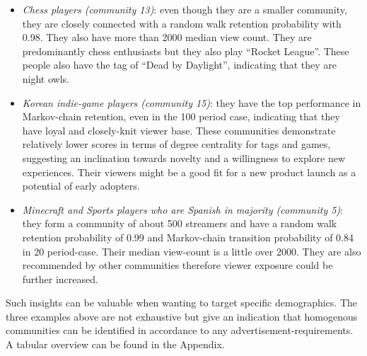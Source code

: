 \documentclass[11pt, oneside]{article}   	%
\begin{document}
\begin{itemize}
\item \textit{Chess players (community 13)}: even though they are a smaller community, they are closely connected with a random walk retention probability with 0.98. They also have more than 2000 median view count. They are predominantly chess enthusiasts but they also play “Rocket League”. These people also have the tag of “Dead by Daylight”, indicating that they are night owls.
\item \textit{Korean indie-game players (community 15)}: they have the top performance in Markov-chain retention, even in the 100 period case, indicating that they have loyal and closely-knit viewer base. These communities demonstrate relatively lower scores in terms of degree centrality for tags and games, suggesting an inclination towards novelty and a willingness to explore new experiences. Their viewers might be a good fit for a new product launch as a potential of early adopters.
\item \textit{Minecraft and Sports players who are Spanish in majority (community 5)}: they form a community of about 500 streamers and have a random walk retention probability of 0.99 and Markov-chain transition probability of 0.84 in 20 period-case. Their median view-count is a little over 2000. They are also recommended by other communities therefore viewer exposure could be further increased.
\end{itemize}
Such insights can be valuable when wanting to target specific demographics. The three examples above are not exhaustive but give an indication that homogenous communities can be identified in accordance to any advertisement-requirements. A tabular overview can be found in the Appendix.
\end{document}
